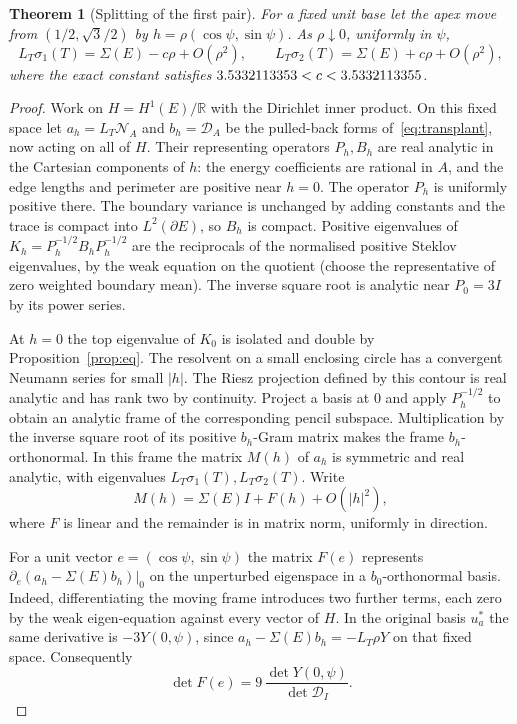 \documentclass[11pt]{article}
\newtheorem{theorem}{Theorem}[section]
\theoremstyle{definition}
\theoremstyle{remark}
\newcommand{\R}{\mathbb{R}}
\begin{document}
\begin{theorem}[Splitting of the first pair]\label{thm:cone}
For a fixed unit base let the apex move from $(1/2,\sqrt3/2)$ by
$h=\rho(\cos\psi,\sin\psi)$. As $\rho\downarrow0$, uniformly in $\psi$,
\[
 L_T\sigma_1(T)=\Sigma(E)-c\rho+O(\rho^2),\qquad
 L_T\sigma_2(T)=\Sigma(E)+c\rho+O(\rho^2),
\]
where the exact constant satisfies $3.5332113353<c<3.5332113355$.
\end{theorem}
\begin{proof}
Work on $H=H^1(E)/\R$ with the Dirichlet inner product. On this fixed space let
$a_h=L_T\mathcal N_A$ and $b_h=\mathcal D_A$ be the pulled-back forms of~\eqref{eq:transplant},
now acting on all of $H$. Their representing operators $P_h,B_h$ are real analytic in the Cartesian
components of $h$: the energy coefficients are rational in $A$, and the edge lengths and perimeter
are positive near $h=0$. The operator $P_h$ is uniformly positive there. The boundary variance is
unchanged by adding constants and the trace is compact into $L^2(\partial E)$, so $B_h$ is compact.
Positive eigenvalues of $K_h=P_h^{-1/2}B_hP_h^{-1/2}$ are the reciprocals of the normalised positive
Steklov eigenvalues, by the weak equation on the quotient (choose the representative of zero
weighted boundary mean). The inverse square root is analytic near $P_0=3I$ by its power series.

At $h=0$ the top eigenvalue of $K_0$ is isolated and double by Proposition~\ref{prop:eq}.
The resolvent on a small enclosing circle has a convergent Neumann series for small $|h|$.
The Riesz projection defined by this contour is real analytic and has rank two by continuity. Project a basis at $0$
and apply $P_h^{-1/2}$ to obtain an analytic frame of the corresponding pencil subspace.
Multiplication by the inverse square root of its positive $b_h$-Gram matrix makes the frame
$b_h$-orthonormal. In this frame the matrix $M(h)$ of $a_h$ is symmetric and real analytic, with
eigenvalues $L_T\sigma_1(T), L_T\sigma_2(T)$. Write
\[
M(h)=\Sigma(E)I+F(h)+O(|h|^2),
\]
where $F$ is linear and the remainder is in matrix norm, uniformly in direction.

For a unit vector $e=(\cos\psi,\sin\psi)$ the matrix $F(e)$ represents
$\partial_e(a_h-\Sigma(E)b_h)|_0$ on the unperturbed eigenspace in a $b_0$-orthonormal basis.
Indeed, differentiating the moving frame introduces two further terms, each zero by the weak
eigen-equation against every vector of $H$. In the original basis $u_a^*$ the same derivative is
$-3Y(0,\psi)$, since $a_h-\Sigma(E)b_h=-L_T\rho Y$ on that fixed space. Consequently
\[
 \det F(e)=9\,\frac{\det Y(0,\psi)}{\det\mathcal D_I}.
\]


\end{proof}
\end{document}
